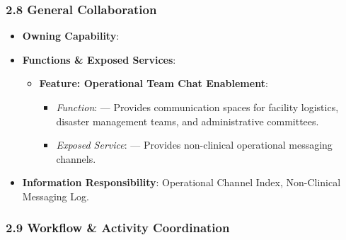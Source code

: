 \par\smallskip
{}\label{rad:ise:160}
\subsubsection*{2.8 General Collaboration}
\label{rad:ise:161}

\begin{itemize}

\item 
\textbf{Owning Capability}: \texttt{}



\item 
\textbf{Functions \& Exposed Services}:


\begin{itemize}

\item 
\textbf{Feature: Operational Team Chat Enablement}:


\begin{itemize}

\item 
\emph{Function}: \texttt{} — Provides communication spaces for facility logistics, disaster management teams, and administrative committees.



\item 
\emph{Exposed Service}: \texttt{} — Provides non-clinical operational messaging channels.



\end{itemize}


\end{itemize}


\item 
\textbf{Information Responsibility}: Operational Channel Index, Non-Clinical Messaging Log.



\end{itemize}
\label{rad:ise:168}

\par\smallskip
{}\label{rad:ise:170}
\subsubsection*{2.9 Workflow \& Activity Coordination}
\label{rad:ise:171}


